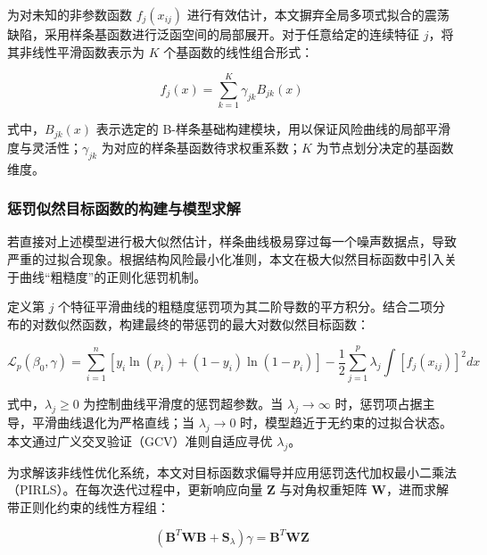 \documentclass[12pt]{article}
\begin{document}
	{\songti{}
		为对未知的非参数函数 $f_j(x_{ij})$ 进行有效估计，本文摒弃全局多项式拟合的震荡缺陷，采用样条基函数进行泛函空间的局部展开。对于任意给定的连续特征 $j$，将其非线性平滑函数表示为 $K$ 个基函数的线性组合形式：
		\par}
	
	\begin{equation}
		f_j(x) = \sum_{k=1}^{K} \gamma_{jk} B_{jk}(x)
	\end{equation}
	
	{\songti{}
		式中，$B_{jk}(x)$ 表示选定的 B-样条基础构建模块，用以保证风险曲线的局部平滑度与灵活性；$\gamma_{jk}$ 为对应的样条基函数待求权重系数；$K$ 为节点划分决定的基函数维度。
		\par}
	
	\subsubsection{惩罚似然目标函数的构建与模型求解}
	{\songti{}
		若直接对上述模型进行极大似然估计，样条曲线极易穿过每一个噪声数据点，导致严重的过拟合现象。根据结构风险最小化准则，本文在极大似然目标函数中引入关于曲线“粗糙度”的正则化惩罚机制。
		\par}
	
	{\songti{}
		定义第 $j$ 个特征平滑曲线的粗糙度惩罚项为其二阶导数的平方积分。结合二项分布的对数似然函数，构建最终的带惩罚的最大对数似然目标函数：
		\par}
	
	\begin{equation}
		\mathcal{L}_p(\beta_0, \gamma) = \sum_{i=1}^{n} \left[ y_i \ln(p_i) + (1-y_i)\ln(1-p_i) \right] - \frac{1}{2}\sum_{j=1}^{p} \lambda_j \int \left[ f_j(x_{ij}) \right]^2 dx
	\end{equation}
	
	{\songti{}
		式中，$\lambda_j \ge 0$ 为控制曲线平滑度的惩罚超参数。当 $\lambda_j \to \infty$ 时，惩罚项占据主导，平滑曲线退化为严格直线；当 $\lambda_j \to 0$ 时，模型趋近于无约束的过拟合状态。本文通过广义交叉验证（GCV）准则自适应寻优 $\lambda_j$。
		\par}
	
	{\songti{}
		为求解该非线性优化系统，本文对目标函数求偏导并应用惩罚迭代加权最小二乘法（PIRLS）。在每次迭代过程中，更新响应向量 $\mathbf{Z}$ 与对角权重矩阵 $\mathbf{W}$，进而求解带正则化约束的线性方程组：
		\par}
	
	\begin{equation}
		\left( \mathbf{B}^T \mathbf{W} \mathbf{B} + \mathbf{S}_\lambda \right) \gamma = \mathbf{B}^T \mathbf{W} \mathbf{Z}
	\end{equation}
	
\end{document}
